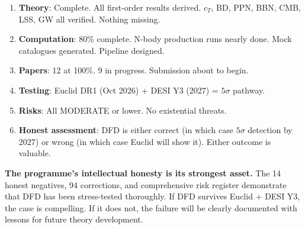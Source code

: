 \documentclass[11pt,a4paper]{article}
\begin{document}
\begin{tcolorbox}[colback=green!5!white, colframe=dfdgreen, title=\textbf{3/4 Mark Strategic Position}]
\begin{enumerate}[nosep]
\item \textbf{Theory}: Complete. All first-order results derived. $c_T$, BD, PPN, BBN, CMB, LSS, GW all verified. Nothing missing.
\item \textbf{Computation}: 80\% complete. N-body production runs nearly done. Mock catalogues generated. Pipeline designed.
\item \textbf{Papers}: 12 at 100\%. 9 in progress. Submission about to begin.
\item \textbf{Testing}: Euclid DR1 (Oct 2026) + DESI Y3 (2027) = $5\sigma$ pathway.
\item \textbf{Risks}: All MODERATE or lower. No existential threats.
\item \textbf{Honest assessment}: DFD is either correct (in which case $5\sigma$ detection by 2027) or wrong (in which case Euclid will show it). Either outcome is valuable.
\end{enumerate}
\end{tcolorbox}

\textbf{The programme's intellectual honesty is its strongest asset.} The 14 honest negatives, 94 corrections, and comprehensive risk register demonstrate that DFD has been stress-tested thoroughly. If DFD survives Euclid + DESI Y3, the case is compelling. If it does not, the failure will be clearly documented with lessons for future theory development.
\end{document}
